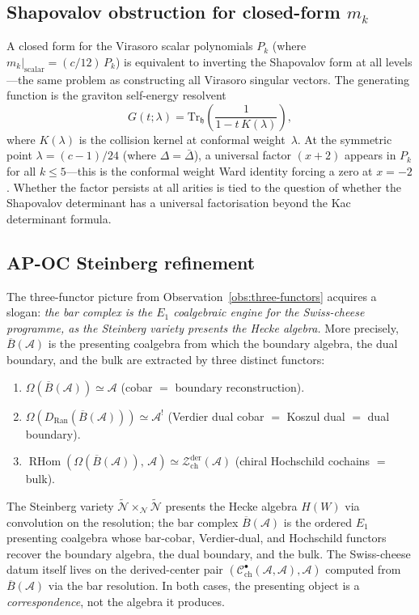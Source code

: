 \documentclass[11pt]{article}
\newcommand{\cA}{\mathcal{A}}
\newcommand{\cC}{\mathcal{C}}
\newcommand{\cN}{\mathcal{N}}
\newcommand{\cZ}{\mathcal{Z}}
\newcommand{\fh}{\mathfrak{h}}
\newcommand{\barB}{\overline{B}}
\newcommand{\RHom}{\operatorname{RHom}}
\begin{document}
\subsection{Shapovalov obstruction for closed-form $m_k$}
\label{subsec:shapovalov-obstruction}

A closed form for the Virasoro scalar polynomials $P_k$ (where
$m_k\big|_{\mathrm{scalar}} = (c/12)\,P_k$) is equivalent to
inverting the Shapovalov form at all levels---the same problem as
constructing all Virasoro singular vectors.  The generating
function is the graviton self-energy resolvent
\[
G(t;\lambda)
  = \mathrm{Tr}_{\fh}\!\left(\frac{1}{1 - t\,K(\lambda)}\right),
\]
where $K(\lambda)$ is the collision kernel at conformal
weight~$\lambda$.  At the symmetric point $\lambda = (c-1)/24$
(where $\Delta = \bar\Delta$), a universal factor $(x+2)$ appears
in $P_k$ for all $k \leq 5$---this is the conformal weight Ward
identity forcing a zero at $x = -2$.  Whether the factor persists
at all arities is tied to the question of whether the Shapovalov
determinant has a universal factorisation beyond the
Kac determinant formula.

\subsection{AP-OC Steinberg refinement}
\label{subsec:ap-oc-steinberg}

The three-functor picture from
Observation~\ref{obs:three-functors} acquires a slogan:
\emph{the bar complex is the $E_1$ coalgebraic engine for the
Swiss-cheese programme, as the Steinberg variety presents the
Hecke algebra.}  More precisely,
$\barB(\cA)$ is the presenting coalgebra from which the
boundary algebra, the dual boundary, and the bulk are extracted
by three distinct functors:
\begin{enumerate}[label=\textup{(\roman*)},nosep]
\item $\Omega(\barB(\cA)) \simeq \cA$
  (cobar $=$ boundary reconstruction).
\item $\Omega(D_{\mathrm{Ran}}(\barB(\cA))) \simeq \cA^!$
  (Verdier dual cobar $=$ Koszul dual $=$ dual boundary).
\item $\RHom(\Omega(\barB(\cA)),\, \cA)
  \simeq \cZ^{\mathrm{der}}_{\mathrm{ch}}(\cA)$
  (chiral Hochschild cochains $=$ bulk).
\end{enumerate}
The Steinberg variety $\widetilde{\cN} \times_{\cN}
\widetilde{\cN}$ presents the Hecke algebra $H(W)$ via
convolution on the resolution; the bar complex
$\barB(\cA)$ is the ordered $E_1$ presenting coalgebra whose
bar-cobar, Verdier-dual, and Hochschild functors recover the
boundary algebra, the dual boundary, and the bulk. The
Swiss-cheese datum itself lives on the derived-center pair
$(\cC^\bullet_{\mathrm{ch}}(\cA,\cA), \cA)$ computed from
$\barB(\cA)$ via the bar resolution. In both
cases, the presenting object is a \emph{correspondence},
not the algebra it produces.
\end{document}
